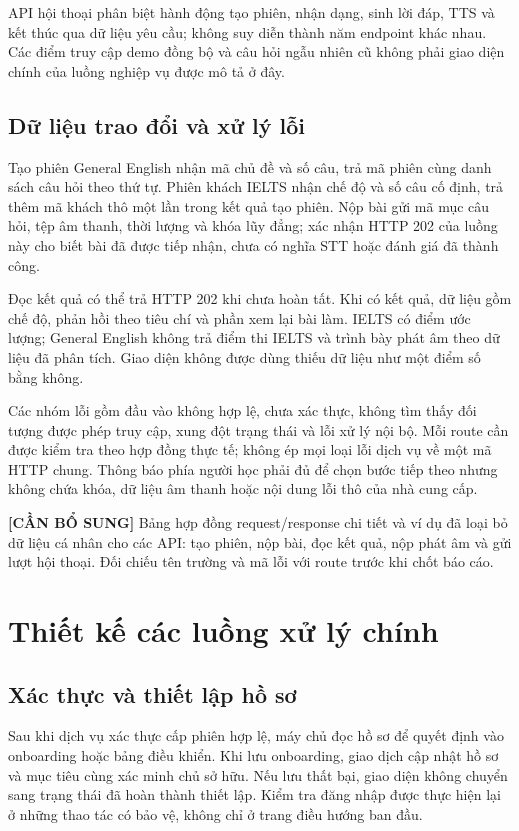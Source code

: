 \documentclass[12pt,a4paper,oneside]{report}
\begin{document}
API hội thoại phân biệt hành động tạo phiên, nhận dạng, sinh lời đáp, TTS và kết thúc qua dữ liệu yêu cầu; không suy diễn thành năm endpoint khác nhau. Các điểm truy cập demo đồng bộ và câu hỏi ngẫu nhiên cũ không phải giao diện chính của luồng nghiệp vụ được mô tả ở đây.

\subsection{Dữ liệu trao đổi và xử lý lỗi}

Tạo phiên General English nhận mã chủ đề và số câu, trả mã phiên cùng danh sách câu hỏi theo thứ tự. Phiên khách IELTS nhận chế độ và số câu cố định, trả thêm mã khách thô một lần trong kết quả tạo phiên. Nộp bài gửi mã mục câu hỏi, tệp âm thanh, thời lượng và khóa lũy đẳng; xác nhận HTTP 202 của luồng này cho biết bài đã được tiếp nhận, chưa có nghĩa STT hoặc đánh giá đã thành công.

Đọc kết quả có thể trả HTTP 202 khi chưa hoàn tất. Khi có kết quả, dữ liệu gồm chế độ, phản hồi theo tiêu chí và phần xem lại bài làm. IELTS có điểm ước lượng; General English không trả điểm thi IELTS và trình bày phát âm theo dữ liệu đã phân tích. Giao diện không được dùng thiếu dữ liệu như một điểm số bằng không.

Các nhóm lỗi gồm đầu vào không hợp lệ, chưa xác thực, không tìm thấy đối tượng được phép truy cập, xung đột trạng thái và lỗi xử lý nội bộ. Mỗi route cần được kiểm tra theo hợp đồng thực tế; không ép mọi loại lỗi dịch vụ về một mã HTTP chung. Thông báo phía người học phải đủ để chọn bước tiếp theo nhưng không chứa khóa, dữ liệu âm thanh hoặc nội dung lỗi thô của nhà cung cấp.

\noindent\textbf{[CẦN BỔ SUNG]} Bảng hợp đồng request/response chi tiết và ví dụ đã loại bỏ dữ liệu cá nhân cho các API: tạo phiên, nộp bài, đọc kết quả, nộp phát âm và gửi lượt hội thoại. Đối chiếu tên trường và mã lỗi với route trước khi chốt báo cáo.

\section{Thiết kế các luồng xử lý chính}

\subsection{Xác thực và thiết lập hồ sơ}

Sau khi dịch vụ xác thực cấp phiên hợp lệ, máy chủ đọc hồ sơ để quyết định vào onboarding hoặc bảng điều khiển. Khi lưu onboarding, giao dịch cập nhật hồ sơ và mục tiêu cùng xác minh chủ sở hữu. Nếu lưu thất bại, giao diện không chuyển sang trạng thái đã hoàn thành thiết lập. Kiểm tra đăng nhập được thực hiện lại ở những thao tác có bảo vệ, không chỉ ở trang điều hướng ban đầu.
\end{document}

